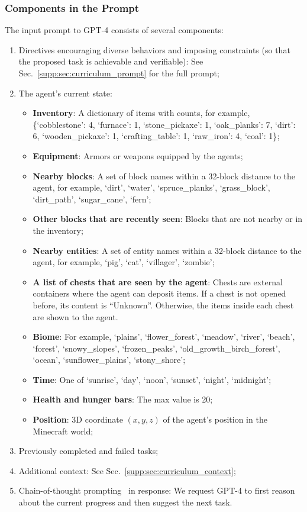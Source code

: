 \subsubsection{Components in the Prompt}
\label{supp:sec:curriculum_components}
The input prompt to GPT-4 consists of several components: 
\begin{enumerate}[label=(\arabic*)]
    \item Directives encouraging diverse behaviors and imposing constraints (so that the proposed task is achievable and verifiable): See Sec.~\ref{supp:sec:curriculum_prompt} for the full prompt;
    \item The agent's current state:\begin{itemize}
        \item \textbf{Inventory}: A dictionary of items with counts, for example, {\{`cobblestone': 4, `furnace': 1, `stone\_pickaxe': 1, `oak\_planks': 7, `dirt': 6, `wooden\_pickaxe': 1, `crafting\_table': 1, `raw\_iron': 4, `coal': 1\}};
        \item \textbf{Equipment}: Armors or weapons equipped by the agents;
        \item \textbf{Nearby blocks}: A set of block names within a 32-block distance to the agent, for example, {`dirt', `water', `spruce\_planks', `grass\_block', `dirt\_path', `sugar\_cane', `fern'};
        \item \textbf{Other blocks that are recently seen}: Blocks that are not nearby or in the inventory;
        \item \textbf{Nearby entities}: A set of entity names within a 32-block distance to the agent, for example, {`pig', `cat', `villager', `zombie'};
        \item \textbf{A list of chests that are seen by the agent}: Chests are external containers where the agent can deposit items. If a chest is not opened before, its content is ``Unknown''. Otherwise, the items inside each chest are shown to the agent.
        \item \textbf{Biome}: For example, {`plains', `flower\_forest', `meadow', `river', `beach', `forest', `snowy\_slopes', `frozen\_peaks', `old\_growth\_birch\_forest', `ocean', `sunflower\_plains', `stony\_shore'};
        \item \textbf{Time}: One of {`sunrise', `day', `noon', `sunset', `night', `midnight'};
        \item \textbf{Health and hunger bars}: The max value is 20;
        \item \textbf{Position}: 3D coordinate $(x,y,z)$ of the agent's position in the Minecraft world;
    \end{itemize}
    \item Previously completed and failed tasks;
    \item Additional context: See Sec.~\ref{supp:sec:curriculum_context};
    \item Chain-of-thought prompting~\cite{wei2022chain} in response: We request GPT-4 to first reason about the current progress and then suggest the next task.
\end{enumerate}

